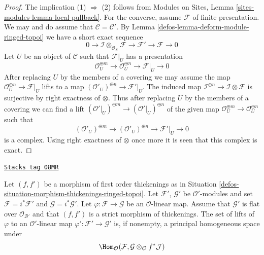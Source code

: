 \begin{proof}

The implication (1) $\Rightarrow$ (2) follows from
Modules on Sites, Lemma \ref{sites-modules-lemma-local-pullback}.
For the converse, assume $\mathcal{F}$ of finite presentation.
We may and do assume that $\mathcal{C} = \mathcal{C}'$.
By Lemma \ref{defos-lemma-deform-module-ringed-topoi} we have a short exact sequence
$$
0 \to \mathcal{I} \otimes_{\mathcal{O}_X} \mathcal{F} \to
\mathcal{F}' \to \mathcal{F} \to 0
$$
Let $U$ be an object of $\mathcal{C}$ such that $\mathcal{F}|_U$ has a
presentation
$$
\mathcal{O}_U^{\oplus m} \to \mathcal{O}_U^{\oplus n} \to \mathcal{F}|_U \to 0
$$
After replacing $U$ by the members of a covering we may assume the
map $\mathcal{O}_U^{\oplus n} \to \mathcal{F}|_U$ lifts to a map
$(\mathcal{O}'_U)^{\oplus n} \to \mathcal{F}'|_U$. The induced map
$\mathcal{I}^{\oplus n} \to \mathcal{I} \otimes \mathcal{F}$ is
surjective by right exactness of $\otimes$. Thus after replacing $U$
by the members of a covering we can find a lift
$(\mathcal{O}'|_U)^{\oplus m} \to (\mathcal{O}'|_U)^{\oplus n}$
of the given map $\mathcal{O}_U^{\oplus m} \to \mathcal{O}_U^{\oplus n}$
such that
$$
(\mathcal{O}'_U)^{\oplus m} \to (\mathcal{O}'_U)^{\oplus n} \to
\mathcal{F}'|_U \to 0
$$
is a complex. Using right exactness of $\otimes$ once more it is seen
that this complex is exact.
\end{proof}

\begin{lemma}
\label{defos-lemma-inf-map-rel-ringed-topoi}
\href{https://stacks.math.columbia.edu/tag/08MR}{\texttt{Stacks tag 08MR}}

Let $(f, f')$ be a morphism of first order thickenings as in
Situation \ref{defos-situation-morphism-thickenings-ringed-topoi}.
Let $\mathcal{F}'$, $\mathcal{G}'$ be $\mathcal{O}'$-modules and set
$\mathcal{F} = i^*\mathcal{F}'$ and $\mathcal{G} = i^*\mathcal{G}'$.
Let $\varphi : \mathcal{F} \to \mathcal{G}$ be an $\mathcal{O}$-linear map.
Assume that $\mathcal{G}'$ is flat over $\mathcal{O}_{\mathcal{B}'}$ and that
$(f, f')$ is a strict morphism of thickenings.
The set of lifts of $\varphi$ to an $\mathcal{O}'$-linear map
$\varphi' : \mathcal{F}' \to \mathcal{G}'$ is, if nonempty, a principal
homogeneous space under
$$
\Hom_\mathcal{O}(\mathcal{F},
\mathcal{G} \otimes_\mathcal{O} f^*\mathcal{J})
$$
\end{lemma}

